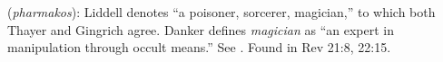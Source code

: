 \item[Magician,]

(\textit{pharmakos}):
Liddell denotes ``a poisoner, sorcerer, magician,'' to which both Thayer and Gingrich agree. Danker defines \emph{magician} as ``an expert in manipulation through occult means.'' See .
Found in Rev 21:8, 22:15.

